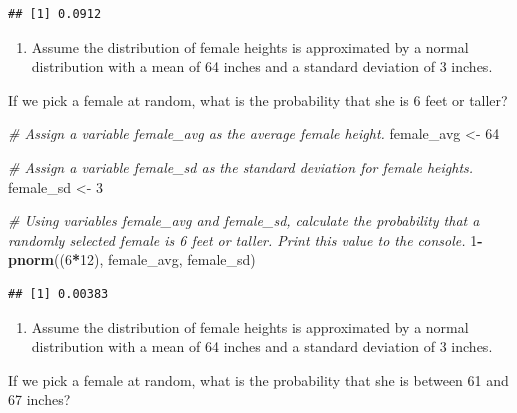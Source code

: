 \documentclass[
]{article}
\newenvironment{Shaded}{\begin{snugshade}}{\end{snugshade}}
\newcommand{\CommentTok}[1]{\textcolor[rgb]{0.56,0.35,0.01}{\textit{#1}}}
\newcommand{\DecValTok}[1]{\textcolor[rgb]{0.00,0.00,0.81}{#1}}
\newcommand{\KeywordTok}[1]{\textcolor[rgb]{0.13,0.29,0.53}{\textbf{#1}}}
\newcommand{\NormalTok}[1]{#1}
\newcommand{\OperatorTok}[1]{\textcolor[rgb]{0.81,0.36,0.00}{\textbf{#1}}}
\newcommand{\StringTok}[1]{\textcolor[rgb]{0.31,0.60,0.02}{#1}}
\providecommand{\tightlist}{%
  \setlength{\itemsep}{0pt}\setlength{\parskip}{0pt}}
\begin{document}
\begin{verbatim}
## [1] 0.0912
\end{verbatim}

\begin{enumerate}
\def\labelenumi{\arabic{enumi}.}
\setcounter{enumi}{1}
\tightlist
\item
  Assume the distribution of female heights is approximated by a normal
  distribution with a mean of 64 inches and a standard deviation of 3
  inches.
\end{enumerate}

If we pick a female at random, what is the probability that she is 6
feet or taller?

\begin{Shaded}
\begin{Highlighting}[]
\CommentTok{\# Assign a variable \textquotesingle{}female\_avg\textquotesingle{} as the average female height.}
\NormalTok{female\_avg \textless{}{-}}\StringTok{ }\DecValTok{64}

\CommentTok{\# Assign a variable \textquotesingle{}female\_sd\textquotesingle{} as the standard deviation for female heights.}
\NormalTok{female\_sd \textless{}{-}}\StringTok{ }\DecValTok{3}

\CommentTok{\# Using variables \textquotesingle{}female\_avg\textquotesingle{} and \textquotesingle{}female\_sd\textquotesingle{}, calculate the probability that a randomly selected female is 6 feet or taller. Print this value to the console.}
\DecValTok{1}\OperatorTok{{-}}\KeywordTok{pnorm}\NormalTok{((}\DecValTok{6}\OperatorTok{*}\DecValTok{12}\NormalTok{), female\_avg, female\_sd)}
\end{Highlighting}
\end{Shaded}

\begin{verbatim}
## [1] 0.00383
\end{verbatim}

\begin{enumerate}
\def\labelenumi{\arabic{enumi}.}
\setcounter{enumi}{2}
\tightlist
\item
  Assume the distribution of female heights is approximated by a normal
  distribution with a mean of 64 inches and a standard deviation of 3
  inches.
\end{enumerate}

If we pick a female at random, what is the probability that she is
between 61 and 67 inches?
\end{document}
